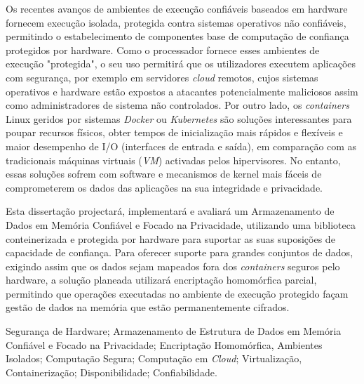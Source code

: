 Os recentes avanços de ambientes de execução confiáveis baseados em hardware fornecem execução isolada, protegida contra sistemas operativos não confiáveis, permitindo o estabelecimento de componentes base de computação de confiança protegidos por hardware. Como o processador fornece esses ambientes de execução "protegida", o seu uso permitirá que os utilizadores executem aplicações com segurança, por exemplo em servidores \textit{cloud} remotos, cujos sistemas operativos e hardware estão expostos a atacantes potencialmente maliciosos assim como administradores de sistema não controlados.
Por outro lado, os \textit{containers} Linux geridos por sistemas \textit{Docker} ou \textit{Kubernetes} são soluções interessantes para poupar recursos físicos, obter tempos de inicialização mais rápidos e flexíveis e maior desempenho de I/O (interfaces de entrada e saída), em comparação com as tradicionais máquinas virtuais (\textit{VM}) activadas pelos hipervisores. No entanto, essas soluções sofrem com software e mecanismos de kernel mais fáceis de comprometerem os dados das aplicações na sua integridade e privacidade.

Esta dissertação projectará, implementará e avaliará um Armazenamento de Dados em Memória Confiável e Focado na Privacidade, utilizando uma biblioteca conteinerizada e protegida por hardware para suportar as suas suposições de capacidade de confiança. Para oferecer suporte para grandes conjuntos de dados, exigindo assim que os dados sejam mapeados fora dos \textit{containers} seguros pelo hardware, a solução planeada utilizará encriptação homomórfica parcial, permitindo que operações executadas no ambiente de execução protegido façam gestão de dados na memória que estão permanentemente cifrados.

\begin{keywords}
Segurança de Hardware; Armazenamento de Estrutura de Dados em Memória Confiável e Focado na Privacidade; Encriptação Homomórfica, Ambientes Isolados; Computação Segura; Computação em \textit{Cloud}; Virtualização, Containerização; Disponibilidade; Confiabilidade.
\end{keywords} 
